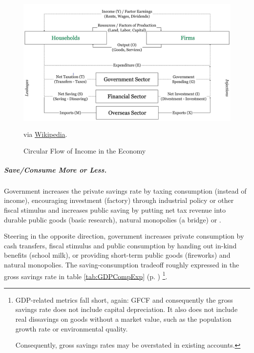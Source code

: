 \begin{figure}[htbp]
	\centering
	\includegraphics[width=1\textwidth]{./img/circular-flow}  
	\caption[Circular Flow in the Economy]{Circular Flow of Income in the Economy}
	\begin{flushleft}
		\scriptsize{via \href{http://en.wikipedia.org/wiki/circular-flowofincome}{Wikipedia}}.
	\end{flushleft}
	\label{fig:circular-flow}
\end{figure}

\subparagraph[Save More or Less]{Save/Consume More or Less.} Government increases the private savings rate by taxing consumption (instead of income), encouraging investment (factory) through industrial policy or other fiscal stimulus and increases public saving by putting net tax revenue into durable public goods (basic research), natural monopolies (a bridge) or . 

Steering in the opposite direction, government increases private consumption by cash transfers, fiscal stimulus and public consumption by handing out in-kind benefits (school milk), or providing short-term public goods (fireworks) and natural monopolies. The saving-consumption tradeoff roughly expressed in the gross savings rate in table \ref{tab:GDPCompExp} (p. \pageref{tab:GDPCompExp}) \footnote{
	GDP-related metrics fall short, again: \gls{GFCF} and consequently the gross savings rate does not include capital depreciation. It also does not include real dissavings on goods without a market value, such as the population growth rate or environmental quality. 
	
	Consequently, gross savings rates may be overstated in existing accounts.}.

